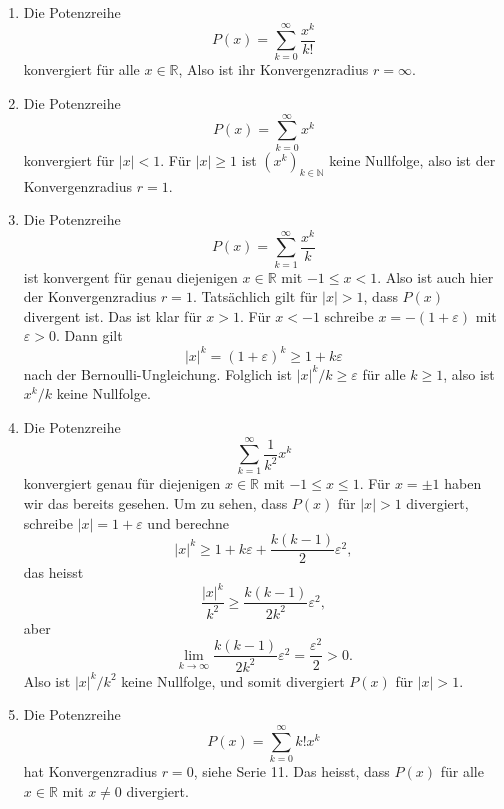 \documentclass[../main.tex]{subfiles}
\begin{document}
\begin{examples}
  \leavevmode
  \begin{enumerate}[(1)]
    \item Die Potenzreihe
      \[
        P(x) = \sum_{k=0}^{\infty} \frac{x^k}{k!}
      \]
      konvergiert für alle $x \in \mathbb{R}$, 
      Also ist ihr Konvergenzradius $r = \infty$.
    \item Die Potenzreihe
      \[
        P(x) = \sum_{k=0}^{\infty} x^k
      \]
      konvergiert für $|x| < 1$. Für $|x| \geq 1$ ist ${(x^{k})}_{k \in \mathbb{N}}$ keine
      Nullfolge, also ist der Konvergenzradius $r = 1$.
    \item Die Potenzreihe
      \[
        P(x) = \sum_{k=1}^{\infty} \frac{x^k}{k}
      \]
      ist konvergent für genau diejenigen $x \in \mathbb{R}$ mit $-1 \leq x < 1$.
      Also ist auch hier der Konvergenzradius $r = 1$.
      Tatsächlich gilt für $|x| > 1$, dass $P(x)$ divergent ist.
      Das ist klar für $x > 1$. Für $x < -1$ schreibe
      $x = -(1 + \varepsilon)$ mit $\varepsilon > 0$.
      Dann gilt 
      \[
        |x|^k = (1 + \varepsilon)^k \geq 1 + k \varepsilon
      \]
      nach der Bernoulli-Ungleichung. Folglich ist $|x|^k/k \geq \varepsilon$ 
      für alle $k \geq 1$, also ist $x^k/k$ keine Nullfolge.
    \item Die Potenzreihe
      \[
        \sum_{k=1}^{\infty} \frac{1}{k^2}x^k
      \]
      konvergiert genau für diejenigen $x \in \mathbb{R}$ mit $-1 \leq x \leq 1$.
      Für $x = \pm 1$ haben wir das bereits gesehen. Um zu sehen, dass
      $P(x)$ für $|x| > 1$ divergiert, schreibe
      \(
        |x| = 1 + \varepsilon
      \)
      und berechne
      \[
        |x|^k \geq 1 + k \varepsilon + \frac{k(k-1)}{2}\varepsilon^2,
      \]
      das heisst
      \[
        \frac{|x|^k}{k^2} \geq \frac{k(k-1)}{2k^2} \varepsilon^2,
      \]
      aber
      \[
        \lim_{k \to \infty} \frac{k(k-1)}{2k^2}\varepsilon^2 = \frac{\varepsilon^2}{2} > 0.
      \]
      Also ist $|x|^k/k^2$ keine Nullfolge, und somit divergiert $P(x)$ für $|x| > 1$.
    \item Die Potenzreihe
      \[
        P(x) = \sum_{k=0}^{\infty} k! x^k
      \]
      hat Konvergenzradius $r = 0$, siehe Serie 11.
      Das heisst, dass $P(x)$ für alle $x \in \mathbb{R}$ mit $x \neq 0$ divergiert.
  \end{enumerate}
\end{examples}
\end{document}
